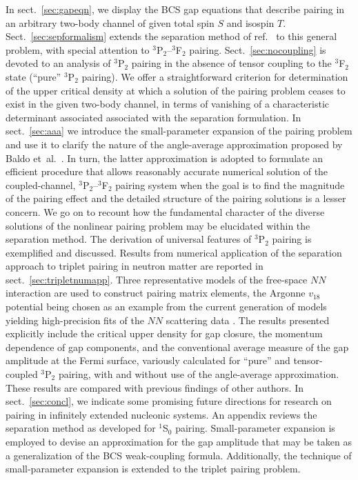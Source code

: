 In sect.~\ref{sec:gapeqn}, we display the BCS gap equations that describe
pairing in an arbitrary two-body channel of given total spin $S$ and 
isospin $T$.  Sect.~\ref{sec:sepformalism} extends the separation method of 
ref.~\cite{kkc} to this general problem, with special attention to 
$^3$P$_2$--$^3$F$_2$ pairing.  Sect.~\ref{sec:nocoupling} is devoted to an 
analysis of $^3$P$_2$ pairing in the absence of tensor coupling to the 
$^3$F$_2$ state (``pure'' $^3$P$_2$ pairing).  We offer a straightforward
criterion for determination of the upper critical density at which a 
solution of the pairing problem ceases to exist in the given two-body 
channel, in terms of vanishing of a characteristic determinant associated
associated with the separation formulation.  In sect.~\ref{sec:aaa} we 
introduce the small-parameter expansion of the pairing problem and use 
it to clarify the nature of the angle-average approximation proposed by 
Baldo et~al.~\cite{baldo2}.  In turn, the latter approximation is adopted
to formulate an efficient procedure that allows reasonably accurate 
numerical solution of the coupled-channel, $^3$P$_2$--$^3$F$_2$ pairing 
system when the goal is to find the magnitude of the pairing effect and 
the detailed structure of the pairing solutions is a lesser concern.  We 
go on to recount how the fundamental character of the diverse solutions of 
the nonlinear pairing problem may be elucidated within the separation 
method.  The derivation of universal features of $^3$P$_2$ pairing is 
exemplified and discussed. Results from numerical application of the 
separation approach to triplet pairing in neutron matter are reported
in sect.~\ref{sec:tripletnumapp}.  Three representative models of the 
free-space $NN$ interaction are used to construct pairing matrix 
elements, the Argonne $v_{18}$ potential \cite{argonne18} being chosen 
as an example from the current generation of models yielding high-precision 
fits of the $NN$ scattering data \cite{nijmegenp}.  The results presented 
explicitly include the critical upper density for gap closure, the momentum 
dependence of gap components, and the conventional average measure of 
the gap amplitude at the Fermi surface, variously calculated for 
``pure'' and tensor-coupled $^3$P$_2$ pairing, with and without use of 
the angle-average approximation.  These results are compared with previous 
findings of other authors.  In sect.~\ref{sec:concl}, we indicate some 
promising future directions for research on pairing in infinitely 
extended nucleonic systems.  An appendix reviews the separation method 
as developed for $^1$S$_0$ pairing.  Small-parameter expansion is employed 
to devise an approximation for the gap amplitude that may be taken 
as a generalization of the BCS weak-coupling formula.  Additionally, 
the technique of small-parameter expansion is extended to the triplet 
pairing problem.

